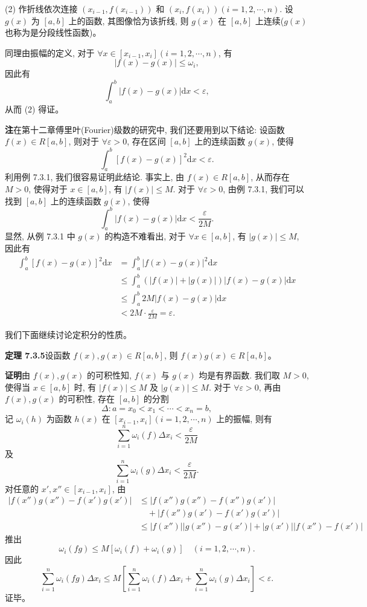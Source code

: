 \documentclass[UTF8,12pt,a4paper,fontset=fandol]{ctexart}
\begin{document}
(2) 作折线依次连接 $(x_{i-1},f(x_{i-1}))$ 和 $(x_i,f(x_i))(i=1,2,\cdots,n)$. 设 $g(x)$ 为 $[a,b]$ 上的函数, 其图像恰为该折线, 则 $g(x)$ 在 $[a,b]$ 上连续($g(x)$ 也称为是分段线性函数)。

同理由振幅的定义, 对于 $\forall x\in[x_{i-1},x_i](i=1,2,\cdots,n)$, 有
\begin{equation}
  |f(x)-g(x)|\leq\omega_i,
  \tag{7.3.4}
\end{equation}
因此有
\[
  \int_a^b |f(x)-g(x)|\mathrm dx<\varepsilon,
\]
从而 (2) 得证。

\noindent\textbf{注}\quad 在第十二章傅里叶(Fourier)级数的研究中, 我们还要用到以下结论: 设函数 $f(x)\in R[a,b]$, 则对于 $\forall\varepsilon>0$, 存在区间 $[a,b]$ 上的连续函数 $g(x)$, 使得
\[
  \int_a^b [f(x)-g(x)]^2\mathrm dx<\varepsilon.
\]
利用例 7.3.1, 我们很容易证明此结论. 事实上, 由 $f(x)\in R[a,b]$, 从而存在 $M>0$, 使得对于 $x\in[a,b]$, 有 $|f(x)|\leq M$. 对于 $\forall\varepsilon>0$, 由例 7.3.1, 我们可以找到 $[a,b]$ 上的连续函数 $g(x)$, 使得
\[
  \int_a^b |f(x)-g(x)|\mathrm dx<\frac{\varepsilon}{2M}.
\]
显然, 从例 7.3.1 中 $g(x)$ 的构造不难看出, 对于 $\forall x\in[a,b]$, 有 $|g(x)|\leq M$, 因此有
\[
\begin{aligned}
  \int_a^b [f(x)-g(x)]^2\mathrm dx
  &=\int_a^b |f(x)-g(x)|^2\mathrm dx\\
  &\leq \int_a^b (|f(x)|+|g(x)|)|f(x)-g(x)|\mathrm dx\\
  &\leq \int_a^b 2M|f(x)-g(x)|\mathrm dx\\
  &<2M\cdot\frac{\varepsilon}{2M}=\varepsilon.
\end{aligned}
\]

我们下面继续讨论定积分的性质。

\noindent\textbf{定理 7.3.5}\quad 设函数 $f(x),g(x)\in R[a,b]$, 则 $f(x)g(x)\in R[a,b]$。

\noindent\textbf{证明}\quad 由 $f(x),g(x)$ 的可积性知, $f(x)$ 与 $g(x)$ 均是有界函数. 我们取 $M>0$, 使得当 $x\in[a,b]$ 时, 有 $|f(x)|\leq M$ 及 $|g(x)|\leq M$. 对于 $\forall\varepsilon>0$, 再由 $f(x),g(x)$ 的可积性, 存在 $[a,b]$ 的分割
\[
  \Delta:a=x_0<x_1<\cdots<x_n=b,
\]
记 $\omega_i(h)$ 为函数 $h(x)$ 在 $[x_{i-1},x_i](i=1,2,\cdots,n)$ 上的振幅, 则有
\begin{equation}
  \sum_{i=1}^n \omega_i(f)\Delta x_i<\frac{\varepsilon}{2M}
  \tag{7.3.5}
\end{equation}
及
\begin{equation}
  \sum_{i=1}^n \omega_i(g)\Delta x_i<\frac{\varepsilon}{2M}.
  \tag{7.3.6}
\end{equation}
对任意的 $x',x''\in[x_{i-1},x_i]$, 由
\[
\begin{aligned}
  |f(x'')g(x'')-f(x')g(x')|
  &\leq |f(x'')g(x'')-f(x'')g(x')|\\
  &\quad+|f(x'')g(x')-f(x')g(x')|\\
  &\leq |f(x'')||g(x'')-g(x')|+|g(x')||f(x'')-f(x')|
\end{aligned}
\]
推出
\[
  \omega_i(fg)\leq M[\omega_i(f)+\omega_i(g)]
  \quad(i=1,2,\cdots,n).
\]
因此
\[
  \sum_{i=1}^n\omega_i(fg)\Delta x_i
  \leq M\left[\sum_{i=1}^n\omega_i(f)\Delta x_i+\sum_{i=1}^n\omega_i(g)\Delta x_i\right]<\varepsilon.
\]
证毕。
\end{document}
